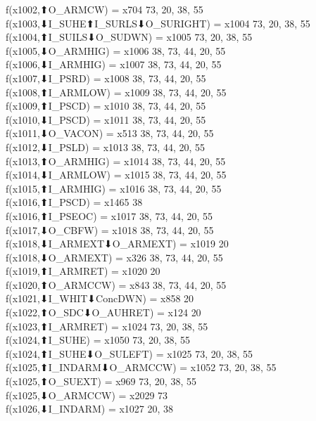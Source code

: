 f(x1002,⬆O_ARMCW) = x704 {73, 20, 38, 55} \\
f(x1003,⬇I_SUHE⬆I_SURLS⬇O_SURIGHT) = x1004 {73, 20, 38, 55} \\
f(x1004,⬆I_SUILS⬇O_SUDWN) = x1005 {73, 20, 38, 55} \\
f(x1005,⬇O_ARMHIG) = x1006 {38, 73, 44, 20, 55} \\
f(x1006,⬇I_ARMHIG) = x1007 {38, 73, 44, 20, 55} \\
f(x1007,⬇I_PSRD) = x1008 {38, 73, 44, 20, 55} \\
f(x1008,⬆I_ARMLOW) = x1009 {38, 73, 44, 20, 55} \\
f(x1009,⬆I_PSCD) = x1010 {38, 73, 44, 20, 55} \\
f(x1010,⬇I_PSCD) = x1011 {38, 73, 44, 20, 55} \\
f(x1011,⬇O_VACON) = x513 {38, 73, 44, 20, 55} \\
f(x1012,⬇I_PSLD) = x1013 {38, 73, 44, 20, 55} \\
f(x1013,⬆O_ARMHIG) = x1014 {38, 73, 44, 20, 55} \\
f(x1014,⬇I_ARMLOW) = x1015 {38, 73, 44, 20, 55} \\
f(x1015,⬆I_ARMHIG) = x1016 {38, 73, 44, 20, 55} \\
f(x1016,⬆I_PSCD) = x1465 {38} \\
f(x1016,⬆I_PSEOC) = x1017 {38, 73, 44, 20, 55} \\
f(x1017,⬇O_CBFW) = x1018 {38, 73, 44, 20, 55} \\
f(x1018,⬇I_ARMEXT⬇O_ARMEXT) = x1019 {20} \\
f(x1018,⬇O_ARMEXT) = x326 {38, 73, 44, 20, 55} \\
f(x1019,⬆I_ARMRET) = x1020 {20} \\
f(x1020,⬆O_ARMCCW) = x843 {38, 73, 44, 20, 55} \\
f(x1021,⬇I_WHIT⬇ConcDWN) = x858 {20} \\
f(x1022,⬆O_SDC⬇O_AUHRET) = x124 {20} \\
f(x1023,⬆I_ARMRET) = x1024 {73, 20, 38, 55} \\
f(x1024,⬆I_SUHE) = x1050 {73, 20, 38, 55} \\
f(x1024,⬆I_SUHE⬇O_SULEFT) = x1025 {73, 20, 38, 55} \\
f(x1025,⬆I_INDARM⬇O_ARMCCW) = x1052 {73, 20, 38, 55} \\
f(x1025,⬆O_SUEXT) = x969 {73, 20, 38, 55} \\
f(x1025,⬇O_ARMCCW) = x2029 {73} \\
f(x1026,⬇I_INDARM) = x1027 {20, 38} \\
